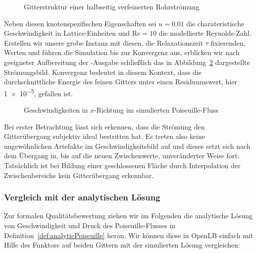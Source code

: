 \begin{figure}[H]
\begin{adjustbox}{center}

\end{adjustbox}
\caption{Gitterstruktur einer halbseitig verfeinerten Rohrströmung}
\label{fig:PoiseuilleGridSetup}
\end{figure}

Neben diesen knotenspezifischen Eigenschaften sei \(u=\num{0.01}\) die charateristische Geschwindigkeit in Lattice-Einheiten und \(\text{Re}=10\) die modellierte Reynolds-Zahl. Erstellen wir unsere grobe  Instanz mit diesen, die Relaxationszeit \(\tau\) fixierenden, Werten und führen die Simulation bis zur Konvergenz aus, erblicken wir nach geeigneter Aufbereitung der -Ausgabe \cite[Kap.~19.3]{vtkGuide10} schließlich das in Abbildung~\ref{fig:PoiseuilleVelocityGrid} dargestellte Strömungsbild. Konvergenz bedeutet in diesem Kontext, dass die durchschnittliche Energie des feinen Gitters unter einen Residuumswert, hier \num{1e-5}, gefallen ist.

\begin{figure}[h]
\begin{adjustbox}{center}

\end{adjustbox}
\caption{Geschwindigkeiten in \(x\)-Richtung im simulierten Poiseuille-Fluss}
\label{fig:PoiseuilleVelocityGrid}
\end{figure}

Bei erster Betrachtung lässt sich erkennen, dass die Strömung den Gitterübergang subjektiv ideal bestritten hat. Es treten also keine ungewöhnlichen Artefakte im Geschwindigkeitsbild auf und dieses setzt sich nach dem Übergang in, bis auf die neuen Zwischenwerte, unveränderter Weise fort. Tatsächlich ist bei Bildung einer geschlossenen Fläche durch Interpolation der Zwischenbereiche kein Gitterübergang erkennbar.

\newpage
\subsubsection{Vergleich mit der analytischen Lösung}

Zur formalen Qualitätsbewertung ziehen wir im Folgenden die analytische Lösung von Geschwindigkeit und Druck des Poiseuille-Flusses in Definition~\ref{def:analyticPoiseuille} heran. Wir können diese in \mbox{OpenLB} einfach mit Hilfe des  Funktors auf beiden Gittern mit der simulierten Lösung vergleichen:

